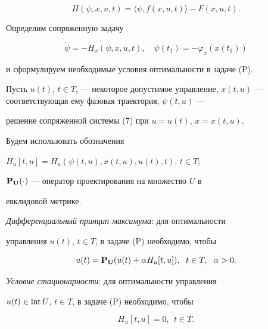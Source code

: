 $$


H(\psi, x, u, t)=\langle \psi, f(x, u, t)\rangle - F(x, u, t).


$$





Определим сопряженную задачу


\begin{equation}


\Dot{\psi}=- H_{x}(\psi, x, u, t),\quad


\psi(t_{1})=- \varphi_{x}(x(t_{1}))


\end{equation}


и сформулируем необходимые условия оптимальности в задаче (P).





Пусть $u(t)$, $t \in T$, --- некоторое допустимое управление, $x(t,


u)$ --- соответствующая ему фазовая траектория, $\psi(t, u)$ ---


решение сопряженной системы (7) при $u=u(t)$, $x=x(t, u)$.





Будем использовать обозначения


$H_{u}[t, u]=H_{u}(\psi(t, u), x(t, u), u(t), t)$, $t \in T$;


$\bold{P}_{\bold U}(\cdot)$ --- оператор проектирования на множество $U$ в


евклидовой метрике.





{\it Дифференциальный принцип максимума}: для оптимальности 


управления $u(t)$, $t \in T$, в задаче (P) необходимо, чтобы


\begin{equation}


u(t)=\bold{P}_{\bold U}(u(t)+\alpha H_{u}[t, u]),


\ \; t \in T,\ \; \alpha>0. 


\end{equation}





{\it Условие стационарности}: для оптимальности управления 


$u(t)\in \operatorname{int} U$, $t \in T$, в задаче (P) необходимо, чтобы


\begin{equation}


H_{u}[t, u]=0,\ \ t \in T.


\end{equation}





